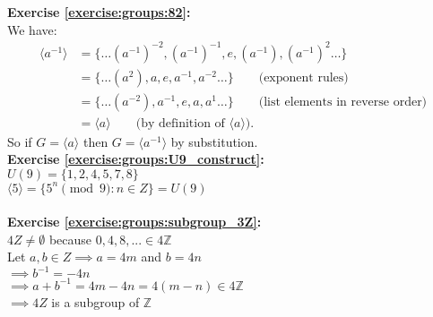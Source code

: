 \noindent\textbf{Exercise \ref{exercise:groups:82}:}\\
We have:
\begin{align*}
\langle a^{-1}\rangle &= \{ \ldots (a^{-1})^{-2},(a^{-1})^{-1},e,(a^{-1}),(a^{-1})^2 \ldots\} \\
& = \{ \ldots (a^{2}),a,e,a^{-1},a^{-2} \ldots\} \qquad \text{(exponent rules)}\\
& = \{ \ldots (a^{-2}),a^{-1},e,a,a^1 \ldots\} \qquad \text{(list elements in reverse order)} \\
& = \langle a\rangle \qquad \text{(by definition of $\langle a\rangle$)}.
\end{align*}
So if $G=\langle a\rangle$ then $G=\langle a^{-1}\rangle$ by substitution.
\\

\noindent\textbf{Exercise \ref{exercise:groups:U9_construct}:}\\
$U(9)=\{1,2,4,5,7,8\}$\\
$\langle 5\rangle=\{5^n\pmod{9}:n\in Z\}=U(9)$\\
\\

\noindent\textbf{Exercise \ref{exercise:groups:subgroup_3Z}:}\\
$4Z\neq\emptyset$ because $0,4,8,...\in 4\mathbb{Z}$\\
Let $a,b\in Z\implies a=4m$ and $b=4n$\\
$\implies b^{-1}=-4n$\\
$\implies a+b^{-1}=4m-4n=4(m-n)\in 4\mathbb{Z}$\\
$\implies 4Z$ is a subgroup of $\mathbb{Z}$\\
\\

